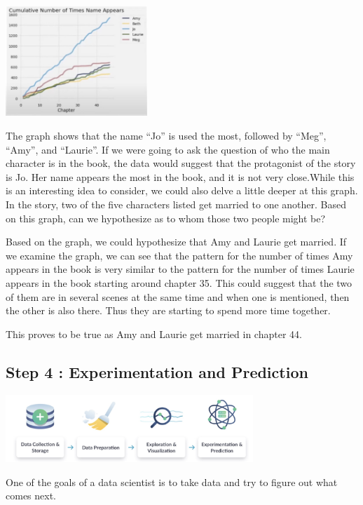 \documentclass[
  letterpaper,
  DIV=11,
  numbers=noendperiod]{scrreprt}
\begin{document}
\includegraphics[width=0.4\textwidth,height=\textheight]{./images/WIDS-6.jpg}

The graph shows that the name ``Jo'' is used the most, followed by
``Meg'', ``Amy'', and ``Laurie''. If we were going to ask the question
of who the main character is in the book, the data would suggest that
the protagonist of the story is Jo. Her name appears the most in the
book, and it is not very close.While this is an interesting idea to
consider, we could also delve a little deeper at this graph. In the
story, two of the five characters listed get married to one another.
Based on this graph, can we hypothesize as to whom those two people
might be?

Based on the graph, we could hypothesize that Amy and Laurie get
married. If we examine the graph, we can see that the pattern for the
number of times Amy appears in the book is very similar to the pattern
for the number of times Laurie appears in the book starting around
chapter 35. This could suggest that the two of them are in several
scenes at the same time and when one is mentioned, then the other is
also there. Thus they are starting to spend more time together.

This proves to be true as Amy and Laurie get married in chapter 44.

\subsection*{Step 4 : Experimentation and
Prediction}\label{step-4-experimentation-and-prediction}

\includegraphics[width=0.7\textwidth,height=\textheight]{./images/WIDS-7.jpg}

One of the goals of a data scientist is to take data and try to figure
out what comes next.
\end{document}
